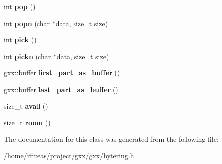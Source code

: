 \begin{DoxyCompactItemize}
\item 
int {\bfseries pop} ()\hypertarget{classgxx_1_1bytering_a797d035bdac1086197108e8c67dc6396}{}\label{classgxx_1_1bytering_a797d035bdac1086197108e8c67dc6396}

\item 
int {\bfseries popn} (char $\ast$data, size\+\_\+t size)\hypertarget{classgxx_1_1bytering_a72f09545c85812a2ab322b3355b4512c}{}\label{classgxx_1_1bytering_a72f09545c85812a2ab322b3355b4512c}

\item 
int {\bfseries pick} ()\hypertarget{classgxx_1_1bytering_ae6fecd2e6f165b489784ce54563af1af}{}\label{classgxx_1_1bytering_ae6fecd2e6f165b489784ce54563af1af}

\item 
int {\bfseries pickn} (char $\ast$data, size\+\_\+t size)\hypertarget{classgxx_1_1bytering_ac14bc1eefb3a9629dcb3df921bc24c2c}{}\label{classgxx_1_1bytering_ac14bc1eefb3a9629dcb3df921bc24c2c}

\item 
\hyperlink{classgxx_1_1buffer}{gxx\+::buffer} {\bfseries first\+\_\+part\+\_\+as\+\_\+buffer} ()\hypertarget{classgxx_1_1bytering_a90fe6c750f2ec2da689bb03052c523fb}{}\label{classgxx_1_1bytering_a90fe6c750f2ec2da689bb03052c523fb}

\item 
\hyperlink{classgxx_1_1buffer}{gxx\+::buffer} {\bfseries last\+\_\+part\+\_\+as\+\_\+buffer} ()\hypertarget{classgxx_1_1bytering_a2270a2ee1053783813b5f4474f9995eb}{}\label{classgxx_1_1bytering_a2270a2ee1053783813b5f4474f9995eb}

\item 
size\+\_\+t {\bfseries avail} ()\hypertarget{classgxx_1_1bytering_ade367bb8d78bee5e4da5474128ccfda3}{}\label{classgxx_1_1bytering_ade367bb8d78bee5e4da5474128ccfda3}

\item 
size\+\_\+t {\bfseries room} ()\hypertarget{classgxx_1_1bytering_a4dd47cc8ea6425f25dab7a2afbdcf682}{}\label{classgxx_1_1bytering_a4dd47cc8ea6425f25dab7a2afbdcf682}

\end{DoxyCompactItemize}


The documentation for this class was generated from the following file\+:\begin{DoxyCompactItemize}
\item 
/home/rfmeas/project/gxx/gxx/bytering.\+h\end{DoxyCompactItemize}
